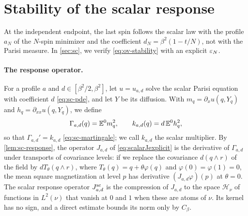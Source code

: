 \section{Stability of the scalar response}\label{sec:overview-stability}

At the independent endpoint, the last spin follows the scalar law with
the profile $a_N$ of the $N$-spin minimizer and the coefficient
$d_N=\beta^2(1-t/N)$, not with the Parisi measure. In \cref{sec:sc}, we
verify \eqref{eq:ov-stability} with an explicit $\varepsilon_N$.

\paragraph{The response operator.}
For a profile $a$ and $d\in[\beta^2/2,\beta^2]$, let $u=u_{a,d}$ solve
the scalar Parisi equation with coefficient $d$ \eqref{eq:sc-pde}, and
let $Y$ be its diffusion. With $m_q=\partial_xu(q,Y_q)$ and
$h_q=\partial_{xx}u(q,Y_q)$, we define
\[
 \Gamma_{a,d}(q)=\mathbb E^0m_q^2,\qquad k_{a,d}(q)=d\,\mathbb E^0h_q^2,
\]
so that $\Gamma_{a,d}'=k_{a,d}$ \eqref{eq:sc-martingale}; we call
$k_{a,d}$ the scalar multiplier. By \cref{lem:sc-response}, the
operator $J_{a,d}$ of \eqref{eq:scalarJexplicit} is the derivative of
$\Gamma_{a,d}$ under transports of covariance levels: if we replace the
covariance $d(q\wedge r)$ of the field by $dT_\theta(q\wedge r)$, where
$T_\theta(q)=q+\theta\varphi(q)$ and $\varphi(0)=\varphi(1)=0$, the mean
square magnetization at level $p$ has derivative $(J_{a,d}\varphi)(p)$
at $\theta=0$. The scalar response operator $J^{\mathrm{sc}}_{a,d}$ is the
compression of $J_{a,d}$ to the space $\mathcal H_\nu$ of functions in
$L^2(\nu)$ that vanish at $0$ and $1$ when these are atoms of $\nu$. Its
kernel has no sign, and a direct estimate bounds its norm only by
$C_\beta$.

